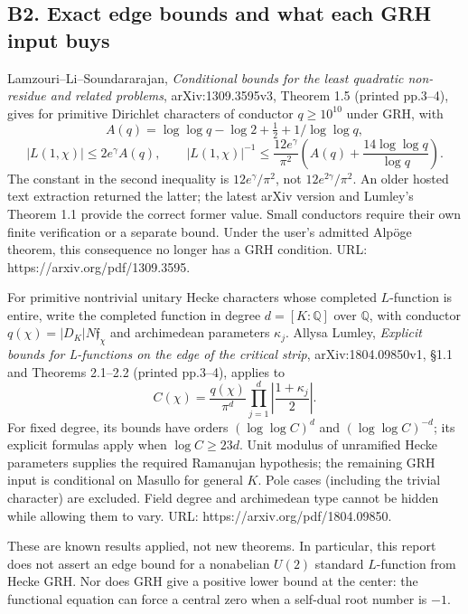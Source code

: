 \documentclass[11pt,a4paper]{article}
\theoremstyle{definition}
\begin{document}
\subsection{B2. Exact edge bounds and what each GRH input buys}\label{b2.-exact-edge-bounds-and-what-each-grh-input-buys}

Lamzouri--Li--Soundararajan, \emph{Conditional bounds for the least quadratic non-residue and related problems}, arXiv:1309.3595v3, Theorem 1.5 (printed pp.3--4), gives for primitive Dirichlet characters of conductor \(q\geq10^{10}\) under GRH, with \[
 A(q)=\log\log q-\log2+\tfrac12+1/\log\log q,
\] \[
 |L(1,\chi)|\leq 2e^\gamma A(q),\qquad
 |L(1,\chi)|^{-1}\leq\frac{12e^\gamma}{\pi^2}
 \left(A(q)+\frac{14\log\log q}{\log q}\right).
\] The constant in the second inequality is \(12e^\gamma/\pi^2\), not \(12e^{2\gamma}/\pi^2\). An older hosted text extraction returned the latter; the latest arXiv version and Lumley's Theorem 1.1 provide the correct former value. Small conductors require their own finite verification or a separate bound. Under the user's admitted Alpöge theorem, this consequence no longer has a GRH condition. URL: https://arxiv.org/pdf/1309.3595.

For primitive nontrivial unitary Hecke characters whose completed \(L\)-function is entire, write the completed function in degree \(d=[K:\mathbb Q]\) over \(\mathbb Q\), with conductor \(q(\chi)=|D_K|N\mathfrak f_\chi\) and archimedean parameters \(\kappa_j\). Allysa Lumley, \emph{Explicit bounds for L-functions on the edge of the critical strip}, arXiv:1804.09850v1, §1.1 and Theorems 2.1--2.2 (printed pp.3--4), applies to \[
 C(\chi)=\frac{q(\chi)}{\pi^d}\prod_{j=1}^d\left|\frac{1+\kappa_j}{2}\right|.
\] For fixed degree, its bounds have orders \((\log\log C)^{d}\) and \((\log\log C)^{-d}\); its explicit formulas apply when \(\log C\geq23d\). Unit modulus of unramified Hecke parameters supplies the required Ramanujan hypothesis; the remaining GRH input is conditional on Masullo for general \(K\). Pole cases (including the trivial character) are excluded. Field degree and archimedean type cannot be hidden while allowing them to vary. URL: https://arxiv.org/pdf/1804.09850.

These are known results applied, not new theorems. In particular, this report does not assert an edge bound for a nonabelian \(U(2)\) standard \(L\)-function from Hecke GRH. Nor does GRH give a positive lower bound at the center: the functional equation can force a central zero when a self-dual root number is \(-1\).
\end{document}
